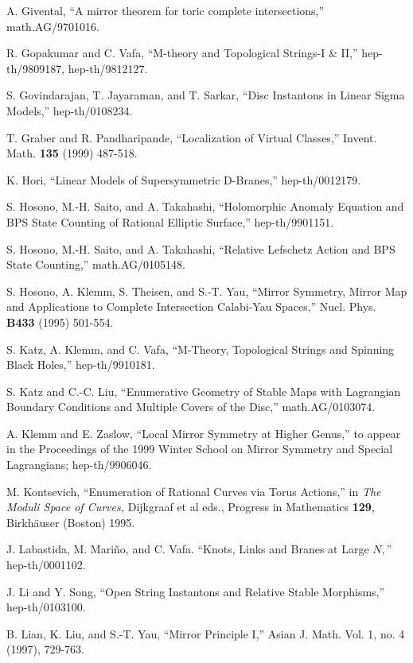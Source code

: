 \documentclass[a4paper,11pt]{article}
\begin{document}
\begin{thebibliography}{99}
 A. Givental, 
``A mirror theorem for toric complete intersections,'' math.AG/9701016.

 R. Gopakumar and C. Vafa,
``M-theory and
Topological Strings-I \& II,''
hep-th/9809187, hep-th/9812127.

S. Govindarajan, T. Jayaraman, and T. Sarkar,
``Disc Instantons in Linear Sigma Models,''
hep-th/0108234.

 T. Graber and R. Pandharipande, 
``Localization
of Virtual Classes,'' 
Invent. Math. {\bf 135} (1999) 487-518.

 K. Hori,
``Linear Models of Supersymmetric D-Branes,''
hep-th/0012179.

S. Hosono, M.-H. Saito, and A. Takahashi,
``Holomorphic Anomaly Equation and BPS State
Counting of Rational Elliptic Surface,''
hep-th/9901151.

S. Hosono, M.-H. Saito, and A. Takahashi,
``Relative Lefschetz Action and BPS State Counting,''
math.AG/0105148.

S. Hosono, A. Klemm, S. Theisen, and S.-T. Yau,
``Mirror Symmetry, Mirror Map and Applications
to Complete Intersection Calabi-Yau Spaces,''
Nucl. Phys. {\bf B433} (1995) 501-554. 

 S. Katz, A. Klemm, and C. Vafa,
``M-Theory, Topological Strings and Spinning Black Holes,''
hep-th/9910181.

 S. Katz and C.-C. Liu,
``Enumerative Geometry of Stable Maps with
Lagrangian Boundary Conditions and
Multiple Covers of the Disc,''
math.AG/0103074.

 A. Klemm and E. Zaslow,
``Local Mirror Symmetry at Higher Genus,''
to appear in the Proceedings of the 1999 Winter School
on Mirror Symmetry and Special Lagrangians;
hep-th/9906046.

M. Kontsevich, ``Enumeration of Rational Curves
via Torus Actions,'' in {\sl The Moduli Space of Curves,}
Dijkgraaf et al eds., Progress in Mathematics {\bf 129},
Birkh\"auser (Boston) 1995.

 J. Labastida, M. Mari\~no, and C. Vafa.
``Knots, Links and Branes at Large $N,$''
hep-th/0001102.

 J. Li and Y. Song,
``Open String Instantons and Relative Stable
Morphisms,'' hep-th/0103100.

 B. Lian, K. Liu, and S.-T. Yau, 
``Mirror Principle I,'' Asian J. Math.  Vol. 1, 
no. 4 (1997), 729-763.


\end{thebibliography}
\end{document}
